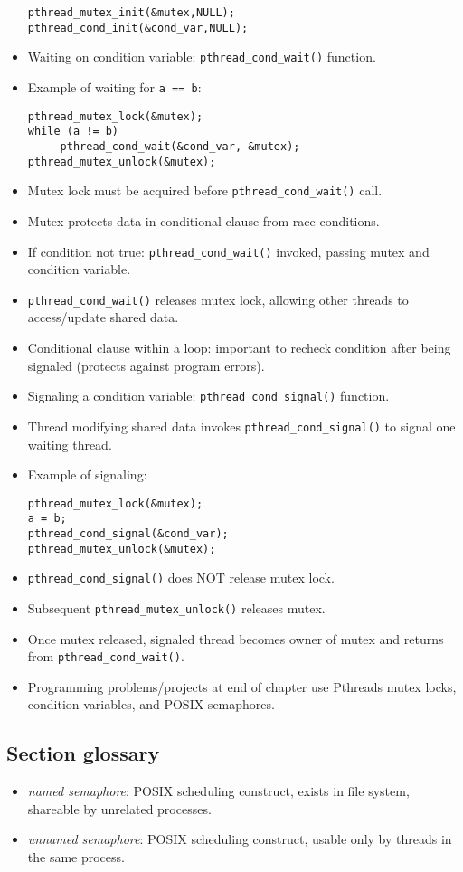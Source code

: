 \begin{itemize}
\begin{verbatim}
pthread_mutex_init(&mutex,NULL);
pthread_cond_init(&cond_var,NULL);
    \end{verbatim}
    \item Waiting on condition variable: \texttt{pthread\_cond\_wait()} function.
    \item Example of waiting for \texttt{a == b}:
    \begin{verbatim}
pthread_mutex_lock(&mutex);
while (a != b)
     pthread_cond_wait(&cond_var, &mutex);
pthread_mutex_unlock(&mutex);
    \end{verbatim}
    \item Mutex lock must be acquired before \texttt{pthread\_cond\_wait()} call.
    \item Mutex protects data in conditional clause from race conditions.
    \item If condition not true: \texttt{pthread\_cond\_wait()} invoked, passing mutex and condition variable.
    \item \texttt{pthread\_cond\_wait()} releases mutex lock, allowing other threads to access/update shared data.
    \item Conditional clause within a loop: important to recheck condition after being signaled (protects against program errors).
    \item Signaling a condition variable: \texttt{pthread\_cond\_signal()} function.
    \item Thread modifying shared data invokes \texttt{pthread\_cond\_signal()} to signal one waiting thread.
    \item Example of signaling:
    \begin{verbatim}
pthread_mutex_lock(&mutex);
a = b;
pthread_cond_signal(&cond_var);
pthread_mutex_unlock(&mutex);
    \end{verbatim}
    \item \texttt{pthread\_cond\_signal()} does NOT release mutex lock.
    \item Subsequent \texttt{pthread\_mutex\_unlock()} releases mutex.
    \item Once mutex released, signaled thread becomes owner of mutex and returns from \texttt{pthread\_cond\_wait()}.
    \item Programming problems/projects at end of chapter use Pthreads mutex locks, condition variables, and POSIX semaphores.
\end{itemize}

\subsection{Section glossary}
\begin{itemize}
    \item \textit{named semaphore}: POSIX scheduling construct, exists in file system, shareable by unrelated processes.
    \item \textit{unnamed semaphore}: POSIX scheduling construct, usable only by threads in the same process.
\end{itemize}
